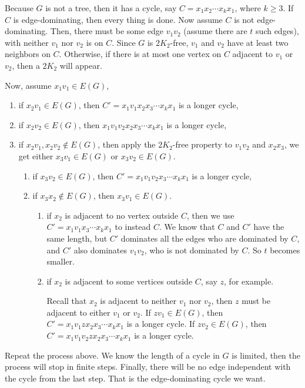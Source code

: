 \documentclass{amsart}
\theoremstyle{definition}
\begin{document}
Because $G$ is not a tree, then it has a cycle, say $C=x_1x_2\cdots x_kx_1$, where $k\ge3$.
If $C$ is edge-dominating, then every thing is done. Now assume $C$ is not edge-dominating. Then, there must be some edge $v_1v_2$ (assume there are $t$ such edges), with neither $v_1$ nor $v_2$ is on $C$. 
Since $G$ is $2K_2$-free, $v_1$ and $v_2$ have at least two neighbors on $C$. Otherwise, if there is at most one vertex on $C$ adjacent to $v_1$ or $v_2$, then a $2K_2$ will appear.

Now, assume $x_1v_1\in E(G)$, 
\begin{enumerate}
\item if $x_2v_1\in E(G)$, then $C'=x_1v_1x_2x_3\cdots x_kx_1$ is a longer cycle,
\item if $x_2v_2\in E(G)$, then $x_1v_1v_2x_2x_3\cdots x_kx_1$ is a longer cycle, 
\item if $x_2v_1,x_2v_2\not\in E(G)$, then apply the $2K_2$-free property to $v_1v_2$ and $x_2x_3$, we get either $x_3v_1\in E(G)$ or $x_3v_2\in E(G)$.
\begin{enumerate}
\item if $x_3v_2\in E(G)$, then $C'=x_1v_1v_2x_3\cdots x_kx_1$ is a longer cycle,
\item if $x_3x_2\not\in E(G)$, then $x_3v_1\in E(G)$.
\begin{enumerate}
\item if $x_2$ is adjacent to no vertex outside $C$, then we use $C'=x_1v_1x_3\cdots x_kx_1$ to instead $C$. We know that $C$ and $C'$ have the same length, but $C'$ dominates all the edges who are dominated by $C$, and $C'$ also dominates $v_1v_2$, who is not dominated by $C$. So $t$ becomes smaller.
\item if $x_2$ is adjacent to some vertices outside $C$, say $z$, for example.

Recall that $x_2$ is adjacent to neither $v_1$ nor $v_2$, then $z$ must be adjacent to either $v_1$ or $v_2$. If $zv_1\in E(G)$, then $C'=x_1v_1zx_2x_3\cdots x_kx_1$ is a longer cycle.
If $zv_2\in E(G)$, then $C'=x_1v_1v_2zx_2x_3\cdots x_kx_1$ is a longer cycle.
\end{enumerate}

\end{enumerate}
\end{enumerate}

Repeat the process above. We know the length of a cycle in $G$ is limited, then the process will stop in finite steps. Finally, there will be no edge independent with the cycle from the last step. That is the edge-dominating cycle we want.
\end{document}
